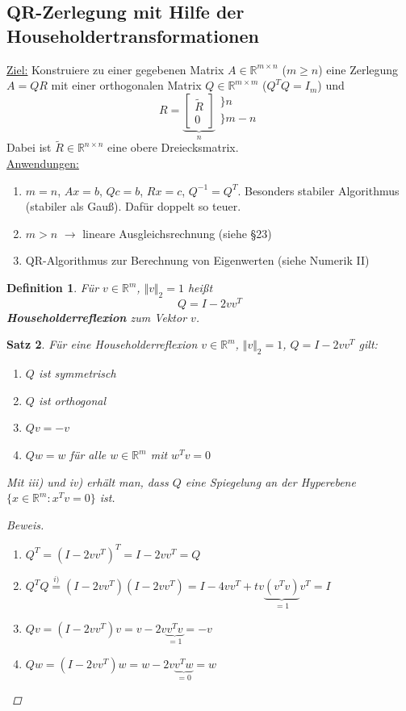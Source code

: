 \documentclass[12pt]{article}
\theoremstyle{break}
\newtheorem{theorem}{Satz}[subsection]
\newtheorem{definition}[theorem]{Definition}
\begin{document}
\subsection{QR-Zerlegung mit Hilfe der Householdertransformationen}
\underline{Ziel:} Konstruiere zu einer gegebenen Matrix $A \in \mathbb{R}^{m \times n}$ ($m \geq n$) eine Zerlegung $A=QR$ mit einer orthogonalen Matrix $Q \in \mathbb{R}^{m \times m}$ ($Q^TQ = I_m$) und 
$$R = \underbrace{\left[ \begin{matrix} \tilde{R} \\ \hline 0\end{matrix} \right]}_{n}\begin{array}{l} \}n \\ \} m-n\end{array}$$
Dabei ist $\tilde{R} \in \mathbb{R}^{n \times n}$ eine obere Dreiecksmatrix.\\
\underline{Anwendungen:}
\renewcommand{\labelenumi}{\alph{enumi})}
\begin{enumerate}
  \item $m=n$, $Ax = b$, $Qc = b$, $Rx=c$, $Q^{-1} = Q^T$. Besonders stabiler Algorithmus (stabiler als Gauß). Dafür doppelt so teuer.
  \item $m>n$ $\rightarrow$ lineare Ausgleichsrechnung (siehe \S 23)
  \item QR-Algorithmus zur Berechnung von Eigenwerten (siehe Numerik II)
\end{enumerate}

\begin{definition}
Für $v \in \mathbb{R}^m$, $\Vert v \Vert_2 = 1$ heißt
$$Q = I - 2 v v^T$$
\textbf{Householderreflexion} zum Vektor $v$.
\end{definition}

\begin{theorem}
Für eine Householderreflexion $v \in \mathbb{R}^m$, $\Vert v \Vert_2 = 1$, $Q = I - 2 v v^T$ gilt:
\renewcommand{\labelenumi}{\roman{enumi})}
\begin{enumerate}
  \item $Q$ ist symmetrisch
  \item $Q$ ist orthogonal
  \item $Qv = -v$
  \item $Qw = w$ für alle $w \in \mathbb{R}^{m}$ mit $w^Tv = 0$
\end{enumerate}
Mit iii) und iv) erhält man, dass $Q$ eine Spiegelung an der Hyperebene $\{x\in \mathbb{R}^m: x^Tv = 0 \}$ ist.
\begin{proof}[Beweis]\leavevmode
\renewcommand{\labelenumi}{\roman{enumi})}
\begin{enumerate}
  \item $Q^T = (I-2vv^T)^T = I-2vv^T = Q$
  \item $Q^TQ \overset{i)}{=} (I-2vv^T)(I-2vv^T) = I - 4 v v^T + t v \underbrace{(v^Tv)}_{=1}v^T = I$ 
  \item $Qv = (I-2vv^T)v = v - 2v \underbrace{v^Tv}_{=1} = - v$
  \item $Qw = (I-2vv^T)w = w - 2v\underbrace{v^Tw}_{=0} = w$
\end{enumerate}
\end{proof}
\end{theorem}
\end{document}
